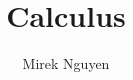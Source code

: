 \documentclass{article}
\begin{document}
\title{Calculus}
\author{Mirek Nguyen}
\date{}

\maketitle
\tableofcontents

\clearpage


\clearpage


\clearpage

\end{document}
